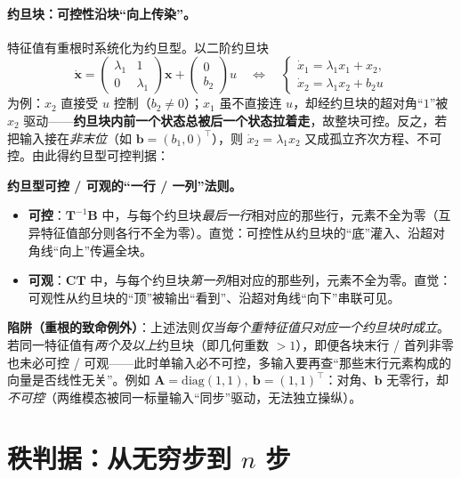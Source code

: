 \paragraph{约旦块：可控性沿块“向上传染”。}
特征值有重根时系统化为约旦型。以二阶约旦块
\[
  \dot{\mathbf{x}}=\begin{pmatrix}\lambda_1 & 1\\ 0 & \lambda_1\end{pmatrix}\mathbf{x}+\begin{pmatrix}0\\ b_2\end{pmatrix}u
  \quad\Longleftrightarrow\quad
  \begin{cases}\dot{x}_1=\lambda_1 x_1+x_2,\\ \dot{x}_2=\lambda_1 x_2+b_2 u\end{cases}
\]
为例\cite{liubao2006modern}：$x_2$ 直接受 $u$ 控制（$b_2\neq0$）；$x_1$ 虽不直接连 $u$，却经约旦块的超对角“$1$”被 $x_2$ 驱动——\textbf{约旦块内前一个状态总被后一个状态拉着走}，故整块可控。反之，若把输入接在\emph{非末位}（如 $\mathbf{b}=(b_1,0)^\top$），则 $\dot{x}_2=\lambda_1 x_2$ 又成孤立齐次方程、不可控。由此得约旦型可控判据\cite{liubao2006modern}：

\begin{insight}
\textbf{约旦型可控 / 可观的“一行 / 一列”法则。}\;
\begin{itemize}
  \item \textbf{可控}：$\mathbf{T}^{-1}\mathbf{B}$ 中，与每个约旦块\emph{最后一行}相对应的那些行，元素不全为零（互异特征值部分则各行不全为零）。直觉：可控性从约旦块的“底”灌入、沿超对角线“向上”传遍全块。
  \item \textbf{可观}：$\mathbf{C}\mathbf{T}$ 中，与每个约旦块\emph{第一列}相对应的那些列，元素不全为零。直觉：可观性从约旦块的“顶”被输出“看到”、沿超对角线“向下”串联可见。
\end{itemize}
\textbf{陷阱（重根的致命例外）}：上述法则\emph{仅当每个重特征值只对应一个约旦块时成立}。若同一特征值有\emph{两个及以上}约旦块（即几何重数 $>1$），即便各块末行 / 首列非零也未必可控 / 可观——此时单输入必不可控，多输入要再查“那些末行元素构成的向量是否线性无关”\cite{liubao2006modern,zhang2017modern}。例如 $\mathbf{A}=\mathrm{diag}(1,1),\ \mathbf{b}=(1,1)^\top$：对角、$\mathbf{b}$ 无零行，却\emph{不可控}（两维模态被同一标量输入“同步”驱动，无法独立操纵）。
\end{insight}

\section{秩判据：从无穷步到 \texorpdfstring{$n$}{n} 步}
\label{sec:co-rank}

